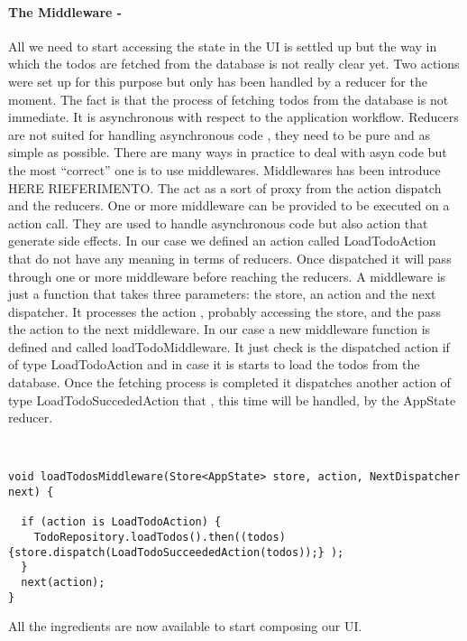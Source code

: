 \paragraph{The Middleware - }
\label{subpar:todo_app_bloc_core_state}
All we need to start accessing the state in the UI is settled up but the way in which the todos are fetched from the database is not really clear yet. Two actions were set up for this purpose but only has been handled by a reducer for the moment. The fact is that the process of fetching todos from the database is not immediate. It is asynchronous with respect to the application workflow. Reducers are not suited for handling asynchronous code , they need to be pure and as simple as possible. There are many ways in practice to deal with asyn code but the most “correct” one is to use middlewares. Middlewares has been introduce HERE RIEFERIMENTO. The act as a sort of proxy from the action dispatch and the reducers. One or more middleware can be provided to be executed on a action call. They are used to handle asynchronous code but also action that generate side effects. In our case we defined an action called LoadTodoAction that do not have any meaning in terms of reducers. Once dispatched it will pass through one or more middleware before reaching the reducers. A middleware is just a function that takes three parameters: the store, an action and the next dispatcher. It processes the action , probably accessing the store, and the pass the action to the next middleware. In our case a new middleware function is defined and called loadTodoMiddleware. It just check is the dispatched action if of type LoadTodoAction and in case it is starts to load the todos from the database. Once the fetching process is completed it dispatches another action of type LoadTodoSuccededAction that , this time will be handled, by the AppState reducer.
\begin{code}
\mbox{}\\
 \mbox{}
		\label{code:2.14}
\begin{verbatim}
void loadTodosMiddleware(Store<AppState> store, action, NextDispatcher next) {

  if (action is LoadTodoAction) {
    TodoRepository.loadTodos().then((todos) {store.dispatch(LoadTodoSucceededAction(todos));} );
  }
  next(action);
}
\end{verbatim}
\mbox{}
\end{code}

All the ingredients are now available to start composing our UI.

